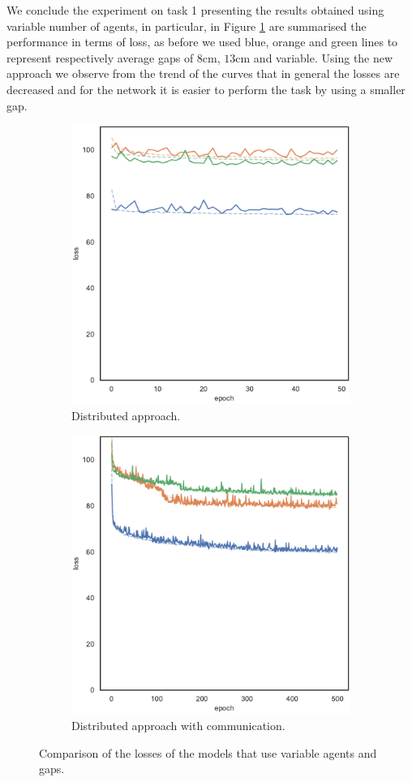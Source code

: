 We conclude the experiment on task 1 presenting the results obtained using 
variable number of agents, in particular, in Figure \ref{fig:commlossNvar} are 
summarised the performance in terms of loss, as before we used blue, orange and 
green lines to represent respectively average gaps of $8$\gls{cm}, $13$\gls{cm} 
and variable.
Using the new approach we observe from the trend of the curves that in general 
the losses are decreased and for the network it is easier to perform the task by 
using a smaller gap.
\begin{figure}[!htb]
	\begin{center}
		\begin{subfigure}[h]{0.49\textwidth}
			\centering
			\includegraphics[width=.7\textwidth]{contents/images/task1-comm-extension/loss-distributed-Nvar@copy}
			\caption{Distributed approach.}
		\end{subfigure}
		\hfill
		\begin{subfigure}[h]{0.49\textwidth}
			\centering
			\includegraphics[width=.7\textwidth]{contents/images/task1-comm-extension/loss-communication-Nvar@copy}
			\caption{Distributed approach with communication.}
		\end{subfigure}	
	\end{center}
	\vspace{-0.5cm}
	\caption{Comparison of the losses of the models that use variable agents and 	
		gaps.}
	\label{fig:commlossNvar}
\end{figure}

